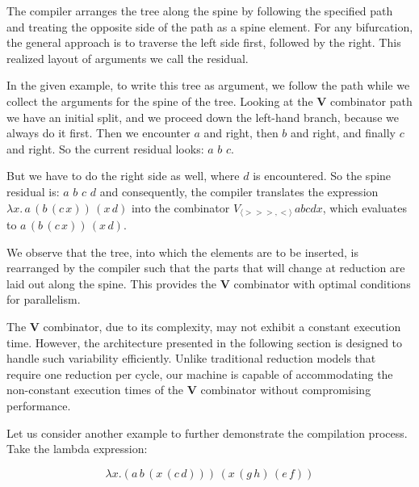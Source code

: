 \documentclass{IEEEtran}
\begin{document}
\par The compiler arranges the tree along the spine by following the specified path and treating the opposite side of the path as a spine element. For any bifurcation, the general approach is to traverse the left side first, followed by the right. This realized layout of arguments we call the residual.

\par In the given example, to write this tree as argument, we follow the path while we collect the arguments for the spine of the tree. Looking at the \textbf{V} combinator path we have an initial split, and we proceed down the left-hand branch, because we always do it first. Then we encounter \(a\) and right, then \(b\) and right, and finally \(c\) and right. So the current residual looks: \(a\) \(b\) \(c\).

But we have to do the right side as well, where \(d\) is encountered. So the spine residual is: \(a\) \(b\) \(c\) \(d\) and consequently, the compiler translates the expression \(\lambda x. \, a \, (b \, (c \, x)) \, (x \, d)\) into the combinator \(V_{\langle > > >, < \rangle} \, abcdx\), which evaluates to \(a \, (b \, (c \, x)) \, (x \, d)\).

\par We observe that the tree, into which the elements are to be inserted, is rearranged by the compiler such that the parts that will change at reduction are laid out along the spine. This provides the \textbf{V} combinator with optimal conditions for parallelism.

The \textbf{V} combinator, due to its complexity, may not exhibit a constant execution time. However, the architecture presented in the following section is designed to handle such variability efficiently. Unlike traditional reduction models that require one reduction per cycle, our machine is capable of accommodating the non-constant execution times of the \textbf{V} combinator without compromising performance.

\par Let us consider another example to further demonstrate the compilation process. Take the lambda expression:

\[
\lambda x. ( a \, b \, (x \, (c \, d))) \, (x \, (g \, h) \, (e \, f))
\]
\end{document}
